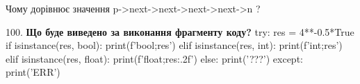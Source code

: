 \documentclass[11pt]{article}
\begin{document}
Чому дорівнює значення p->next->next->next->next->n ?\par\vspace{5mm}
100. \textbf{Що буде виведено за виконання фрагменту коду?}
try:
    res = 4**-0.5*True
    if isinstance(res, bool):
        print(f'bool;{res}')
    elif isinstance(res, int):
        print(f'int;{res}')
    elif isinstance(res, float):
        print(f'float;{res:.2f}')
    else:
        print('???')
except:
    print('ERR')
\par\vspace{5mm}
\end{document}
